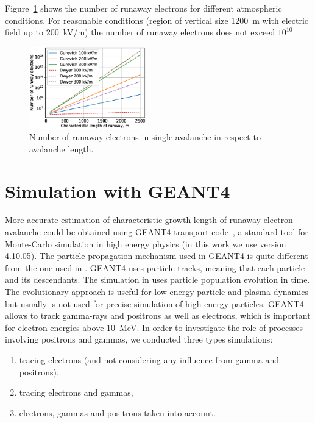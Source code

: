 \documentclass[doublecol,linenumbers]{epl2} %
\begin{document}
Figure~\ref{fig:gur} shows the number of runaway electrons for different atmospheric conditions. For reasonable conditions  (region of vertical size 1200~m with electric field up to 200~kV/m) the number of runaway electrons does not exceed $10^{10}$.
\begin{figure}[h]
    \centering
    \includegraphics[width=0.45\textwidth]{figures/gurevich.eps}
    \caption{Number of runaway electrons in single avalanche in respect to avalanche length.}
    \label{fig:gur}
\end{figure}

\section{Simulation with GEANT4}
More accurate estimation of characteristic growth length of runaway electron avalanche could be obtained using GEANT4 transport code~\cite{Geant2003,Geant2006, Geant2016}, a standard tool for Monte-Carlo simulation in high energy physics (in this work we use version 4.10.05). The particle propagation mechanism used in GEANT4 is quite different from the one used in \cite{Oreshkin_2018}. GEANT4 uses particle tracks, meaning that each particle and its descendants. The simulation in \cite{Oreshkin_2018} uses particle population evolution in time. The evolutionary approach is useful for low-energy particle and plasma dynamics but usually is not used for precise simulation of high energy particles. GEANT4 allows to track gamma-rays and positrons as well as electrons, which is important for electron energies above 10~MeV. In order to investigate the role of processes involving positrons and gammas, we conducted three types simulations: 
\begin{enumerate}
    \item tracing electrons (and not considering any influence from gamma and positrons),
    \item tracing electrons and gammas, 
    \item electrons, gammas and positrons taken into account. 
\end{enumerate}
\end{document}
